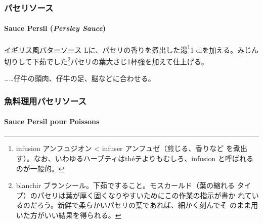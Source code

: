 \begin{recette}
\maeaki

\hypertarget{ux30d1ux30bbux30eaux30bdux30fcux30b9}{%
\subsubsection{パセリソース}\label{ux30d1ux30bbux30eaux30bdux30fcux30b9}}

\hypertarget{perseley-sauce}{%
\paragraph{\texorpdfstring{Sauce Persil (\emph{Persley
Sauce})}{Sauce Persil (Persley Sauce)}}\label{perseley-sauce}}


\protect\hyperlink{bread-sauce}{イギリス風バターソース}\undemi{}
Lに、パセリの香りを煮出した湯\footnote{infusion アンフュジオン
  \textless{} infuser アンフュゼ（煎じる、香りなど
  を煮出す）。なお、いわゆるハーブティはthéテよりもむしろ、infusion
  と呼ばれるのが一般的。}1
dlを加える。みじん切りして下茹でした\footnote{blanchir
  ブランシール。下茹ですること。モスカールド（葉の縮れる
  タイプ）のパセリは葉が厚く固くなりやすいためにこの作業の指示が書か
  れているのだろう。新鮮で柔らかいパセリの葉であれば、細かく刻んでそ
  のまま用いた方がいい結果を得られる。}パセリの葉大さじ1杯強を加えて仕上げる。

\ldots{}\ldots{}仔牛の頭肉、仔牛の足、脳などに合わせる。

\maeaki

\hypertarget{ux9b5aux6599ux7406ux7528ux30d1ux30bbux30eaux30bdux30fcux30b9}{%
\subsubsection{魚料理用パセリソース}\label{ux9b5aux6599ux7406ux7528ux30d1ux30bbux30eaux30bdux30fcux30b9}}

\hypertarget{sauce-persil-pour-poissons}{%
\paragraph{Sauce Persil pour
Poissons}\label{sauce-persil-pour-poissons}}


\end{recette}

